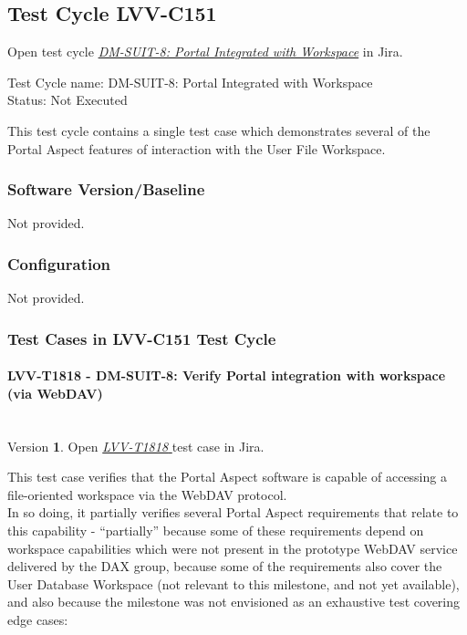 \documentclass[DM,lsstdraft,STR,toc]{lsstdoc}
\begin{document}
\subsection{Test Cycle LVV-C151 }

Open test cycle {\it \href{https://jira.lsstcorp.org/secure/Tests.jspa#/testrun/LVV-C151}{DM-SUIT-8: Portal Integrated with Workspace}} in Jira.

Test Cycle name: DM-SUIT-8: Portal Integrated with Workspace\\
Status: Not Executed

This test cycle contains a single test case which demonstrates several
of the Portal Aspect features of interaction with the User File
Workspace.

\subsubsection{Software Version/Baseline}
Not provided.

\subsubsection{Configuration}
Not provided.

\subsubsection{Test Cases in LVV-C151 Test Cycle}

\paragraph{ LVV-T1818 - DM-SUIT-8: Verify Portal integration with workspace (via WebDAV) }\mbox{}\\

Version \textbf{1}.
Open  \href{https://jira.lsstcorp.org/secure/Tests.jspa#/testCase/LVV-T1818}{\textit{ LVV-T1818 } }
test case in Jira.

This test case verifies that the Portal Aspect software is capable of
accessing a file-oriented workspace via the WebDAV
protocol.\\[2\baselineskip]In so doing, it partially verifies several
Portal Aspect requirements that relate to this capability -
``partially'' because some of these requirements depend on workspace
capabilities which were not present in the prototype WebDAV service
delivered by the DAX group, because some of the requirements also cover
the User Database Workspace (not relevant to this milestone, and not yet
available), and also because the milestone was not envisioned as an
exhaustive test covering edge cases:
\end{document}
